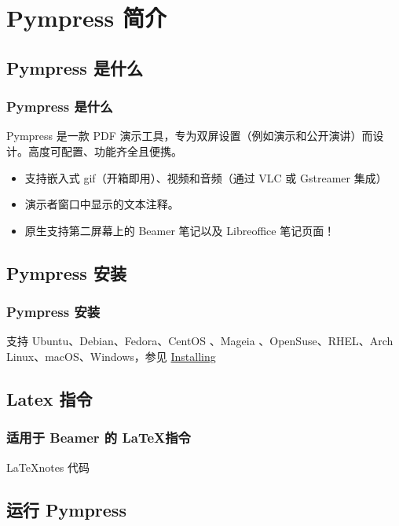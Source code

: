 \documentclass[xcolor=table,dvipsnames,svgnames,aspectratio=169]{ctexbeamer}
\begin{document}
\section{Pympress 简介}

\subsection{Pympress 是什么}

\begin{frame}
  \frametitle{Pympress 是什么}

  Pympress 是一款 PDF 演示工具，专为双屏设置（例如演示和公开演讲）而设计。高度可配置、功能齐全且便携。

  \begin{itemize}
    \item 支持嵌入式 gif（开箱即用）、视频和音频（通过 VLC 或 Gstreamer 集成）
    \item 演示者窗口中显示的文本注释。
    \item 原生支持第二屏幕上的 Beamer 笔记以及 Libreoffice 笔记页面！
  \end{itemize}
\end{frame}

\subsection{Pympress 安装}

\begin{frame}
  \frametitle{Pympress 安装}
  支持 Ubuntu、Debian、Fedora、CentOS 、Mageia 、OpenSuse、RHEL、Arch Linux、macOS、Windows，参见 \href{https://github.com/Cimbali/pympress?tab=readme-ov-file\#installing-}{Installing}
\end{frame}

\subsection{Latex 指令}

\begin{frame}[fragile]
  \frametitle{适用于 Beamer 的 \LaTeX 指令}
  \begin{codeblock}{\LaTeX notes 代码}
  \end{codeblock}
\end{frame}

\subsection{运行 Pympress}
\end{document}
